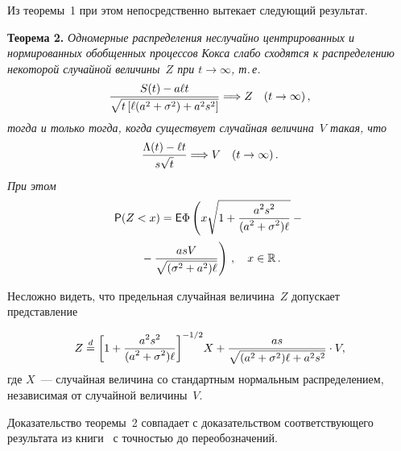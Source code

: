 \begin{multicols}{2}
Из теоремы~1 при этом непосредственно вытекает следующий
результат.

\medskip

\noindent
\textbf{Теорема 2.} {\it Одномерные распределения неслучайно
центрированных и нормированных обобщенных процессов Кокса слабо
сходятся к распределению некоторой случайной величины~$Z$ при
$t\to\infty$, т.\,е.
$$
\displaystyle\frac{\displaystyle S(t)-a\ell t\mathstrut}{\displaystyle \sqrt{t\left[\ell
(a^2+\sigma^2)+a^2s^2\right]}\mathstrut}\Longrightarrow Z\quad (t\to\infty)\,,
$$
тогда и только тогда, когда существует случайная величина~$V$
такая, что
$$
\displaystyle\frac{\displaystyle \Lambda(t)-\ell t\mathstrut}{\displaystyle s\sqrt{t}\mathstrut}\Longrightarrow V\quad
(t\to\infty)\,.
$$
При этом}
\begin{multline*}
{\sf P}(Z<x)={\sf
E}\Phi\left(x\sqrt{1+\fr{a^2s^2}{(a^2+\sigma^2)\ell}}-{}\right.\\
\left.{}-\fr{asV}{\sqrt{(\sigma^2+a^2)\ell}}
\vphantom{\sqrt{1+\fr{a^2s^2}{(a^2+\sigma^2)\ell}}}
\right)\,,\quad
x\in\mathbb{R}\,.
\end{multline*}

\medskip

Несложно видеть, что предельная случайная величина~$Z$ допускает
представление

\noindent
$$
Z\stackrel{d}{=} \left[1+\displaystyle\frac{\displaystyle a^2s^2\mathstrut}{\displaystyle (a^2+\sigma^2)\ell\mathstrut}\right]^{-1/2}\!
X+\displaystyle\frac{\displaystyle as\mathstrut}{\displaystyle \sqrt{(a^2+\sigma^2)\ell+a^2s^2}\mathstrut}\cdot V,
$$
где $X$~--- случайная величина со стандартным нормальным
распределением, независимая от случайной величины~$V$.

Доказательство теоремы~2 совпадает с доказательством
соответствующего результата из книги~\cite{10kk} с точностью до
переобозначений.


\end{multicols}
